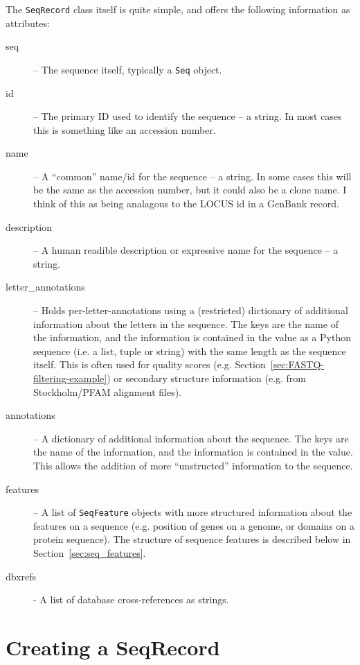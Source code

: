 \documentclass{report}
\begin{document}
The \verb|SeqRecord| class itself is quite simple, and offers the following information as attributes:

\begin{description}
  \item[seq] -- The sequence itself, typically a \verb|Seq| object.

  \item[id] -- The primary ID used to identify the sequence -- a string. In most cases this is something like an accession number.

  \item[name] -- A ``common'' name/id for the sequence -- a string. In some cases this will be the same as the accession number, but it could also be a clone name. I think of this as being analagous to the LOCUS id in a GenBank record.

  \item[description] -- A human readible description or expressive name for the sequence -- a string.
  
  \item[letter\_annotations] -- Holds per-letter-annotations using a (restricted) dictionary of additional information about the letters in the sequence. The keys are the name of the information, and the information is contained in the value as a Python sequence (i.e. a list, tuple or string) with the same length as the sequence itself.  This is often used for quality scores (e.g. Section~\ref{sec:FASTQ-filtering-example}) or secondary structure information (e.g. from Stockholm/PFAM alignment files).

  \item[annotations] -- A dictionary of additional information about the sequence. The keys are the name of the information, and the information is contained in the value. This allows the addition of more ``unstructed'' information to the sequence.
  
  \item[features] -- A list of \verb|SeqFeature| objects with more structured information about the features on a sequence (e.g. position of genes on a genome, or domains on a protein sequence). The structure of sequence features is described below in Section~\ref{sec:seq_features}.
  
  \item[dbxrefs] - A list of database cross-references as strings.
\end{description}

\section{Creating a SeqRecord}
\end{document}
